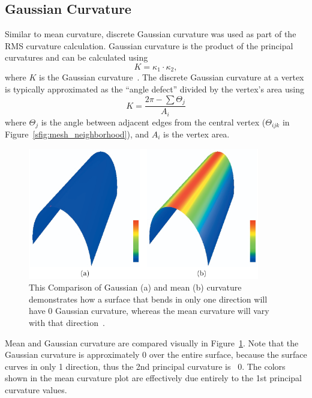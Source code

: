 \subsection{Gaussian Curvature}\label{sec:gauss_k}
Similar to mean curvature, discrete Gaussian curvature was used as part of the RMS curvature calculation.
Gaussian curvature is the product of the principal curvatures and can be calculated using
\begin{equation*}%
	K = \kappa_1 \cdot \kappa_2,
\end{equation*}
where $K$ is the Gaussian curvature~\cite{TheoremaEgregium}.
The discrete Gaussian curvature at a vertex is typically approximated as the ``angle defect'' divided by the vertex's area using
\begin{equation}\label{eq:disc_gauss_k}
	K = \frac{2\pi - \sum \Theta_j}{A_i}
\end{equation}
where $\Theta_j$ is the angle between adjacent edges from the central vertex ($\Theta_{ijk}$ in Figure~\ref{sfig:mesh_neighborhood}), and $A_i$ is the vertex area.

\begin{figure}[htb]
	\centering
	\includegraphics[width=0.9\textwidth]{../resources/curvature/gaussian_mean_k.png}
	\caption{This Comparison of Gaussian (a) and mean (b) curvature demonstrates how a surface that bends in only one direction will have 0 Gaussian curvature, whereas the mean curvature will vary with that direction~\cite{Imp_k_estimation_for_WS}.}
	\label{fig:mean_gauss_k} %
\end{figure}

Mean and Gaussian curvature are compared visually in Figure~\ref{fig:mean_gauss_k}.
Note that the Gaussian curvature is approximately 0 over the entire surface, because the surface curves in only 1 direction, thus the 2nd principal curvature is ~0.
The colors shown in the mean curvature plot are effectively due entirely to the 1st principal curvature values.


